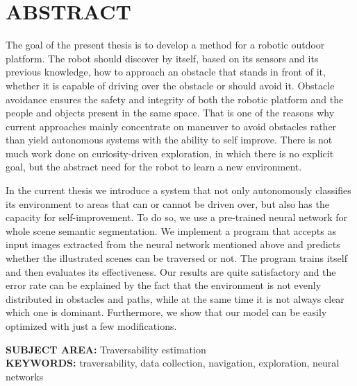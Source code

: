 \documentclass[12pt,a4paper,table,dvipsnames,tikz]{report}
\begin{document}
	\setmainfont[Ligatures={Common,TeX}]{Arial} %
	\setsansfont[Mapping=tex-text,Scale=MatchLowercase]{Arial}
	
	
		
		
	\chapter*{ABSTRACT}
	\thispagestyle{empty}
	
	The goal of the present thesis is to develop a method for a robotic outdoor platform. 
	The robot should discover by itself, based on its sensors and its previous knowledge, 
	how to approach an obstacle that stands in front of it, whether it is capable of 
	driving over the obstacle or should avoid it.	
	Obstacle avoidance ensures the safety and integrity of both the robotic platform and the 
	people and objects present in the same space. That is one of the reasons why 
	current approaches mainly concentrate on maneuver to avoid obstacles rather 
	than yield autonomous systems with the ability to self improve.
	There is not much work done on curiosity-driven exploration, in which there is no 
	explicit goal, but the abstract need for the robot to learn a new environment.
	\par
	In the current thesis we introduce a system that not only autonomously classifies 
	its environment to areas that can or cannot be driven over, but also has the capacity 
	for self-improvement.
	To do so, we use a pre-trained neural network for whole scene semantic segmentation.
	We implement a program that accepts as input images extracted from the neural network
	mentioned above and	predicts whether the illustrated scenes can be traversed or not. 
	The program trains itself and then evaluates its effectiveness.
	Our results are quite satisfactory and the error rate can be explained by the fact 
	that the environment is not evenly distributed in obstacles and paths, while at the 
	same time it is not always clear which one is dominant.
	Furthermore, we show that our model can be easily optimized with just a few 
	modifications. 
	
	\vfill
	\noindent
	\MakeUppercase{\textbf{Subject Area: }} Traversability estimation
	\\
	\MakeUppercase{\textbf{Keywords: }} traversability, data collection, navigation, 
	exploration, neural networks 
	
\end{document}
